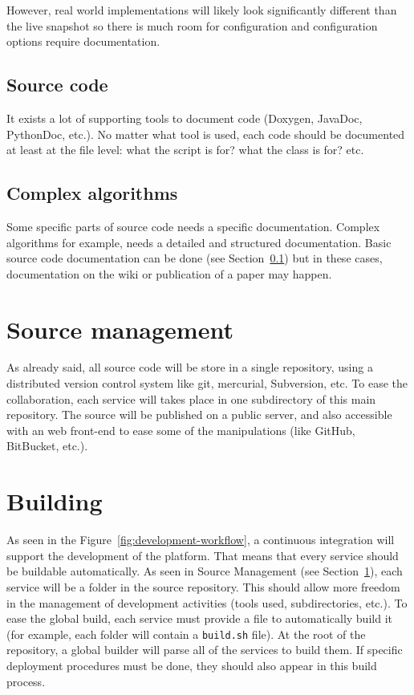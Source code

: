 However, real world implementations will likely look significantly different than the live
snapshot so there is much room for configuration and configuration options require
documentation.

\subsection{Source code}
\label{sec:source-code}

It exists a lot of supporting tools to document code (Doxygen, JavaDoc, PythonDoc, etc.).
No matter what tool is used, each code should be documented at least at the file level: what the
script is for? what the class is for? etc.

\subsection{Complex algorithms}
\label{sec:complex-algorithms}

Some specific parts of source code needs a specific documentation.
Complex algorithms for example, needs a detailed and structured documentation.
Basic source code documentation can be done (see Section~\ref{sec:source-code}) but in these cases,
documentation on the wiki or publication of a paper may happen.

\section{Source management}
\label{sec:source-management}

As already said, all source code will be store in a single repository, using a distributed version
control system like git, mercurial, Subversion, etc.
To ease the collaboration, each service will takes place in one subdirectory of this main
repository. The source will be published on a public server, and also accessible with an web
front-end to ease some of the manipulations (like GitHub, BitBucket, etc.).

\section{Building}
\label{sec:building}

As seen in the Figure~\ref{fig:development-workflow}, a continuous integration will support the
development of the platform. That means that every service should be buildable automatically.
As seen in Source Management (see Section~\ref{sec:source-management}), each service will be a
folder in the source repository. This should allow more freedom in the management of development
activities (tools used, subdirectories, etc.). To ease the global build, each service must provide
a file to automatically build it (for example, each folder will contain a \texttt{build.sh} file).
At the root of the repository, a global builder will parse all of the services to build them.
If specific deployment procedures must be done, they should also appear in this build process.

